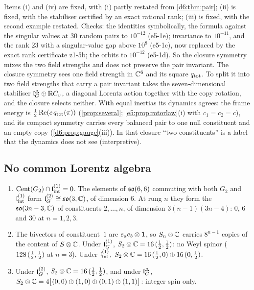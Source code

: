Items (i) and (iv) are fixed, with (i) partly restated from \cref{d6:thm:pair}; (ii) is fixed, with the stabiliser certified by an exact rational rank;
(iii) is fixed, with the second example restated. Checks: the identities symbolically, the formula against the singular values at $30$ random
pairs to $10^{-12}$ (e5-1e); invariance to $10^{-11}$, and the rank $23$ with a singular-value gap above $10^8$ (e5-1c), now replaced by the exact rank certificate z1-5b; the orbits to
$10^{-12}$ (e5-1d). So the closure symmetry mixes the two field strengths and does not preserve the pair invariant. The closure symmetry sees one field strength in $\mathbb{C}^6$ and its square $q_{\rm tot}$. To split it into two
field strengths that carry a pair invariant takes the seven-dimensional stabiliser $\mathfrak l_G^\Delta\oplus\mathbb{R} C_v$, a diagonal Lorentz action together
with the copy rotation, and the closure selects neither. With equal inertias its dynamics agrees: the frame energy is $\tfrac12\operatorname{Re}(c\,q_{\rm tot}(\pi))$
(\cref{prop:several}; \cref{e5:prop:rotorlaw}(i) with $c_1=c_2=c$), and its compact symmetry carries every balanced pair to one null constituent and an empty copy (\cref{d6:prop:gauge}(iii)). In that closure ``two constituents'' is a label that the dynamics does not see (interpretive).

\subsection{No common Lorentz algebra}
\label{e5:sec:nocommon}

\begin{proposition}
\label{e5:prop:nocommon}
\begin{enumerate}[label=(\roman*),leftmargin=2.2em]
\item $\operatorname{Cent}(G_2)\cap\mathfrak l_{\rm int}^{(1)}=0$. The elements of $\mathfrak{so}(6,6)$ commuting with both $G_2$ and $\mathfrak l_{\rm int}^{(1)}$ form $\mathfrak l_G^{(2)}\cong\mathfrak{so}(3,\mathbb{C})$, of
dimension $6$. At rung $n$ they form the $\mathfrak{so}(3n-3,\mathbb{C})$ of constituents $2,\dots,n$, of dimension $3(n-1)(3n-4)$: $0$, $6$ and $30$ at
$n=1,2,3$.
\item The bivectors of constituent~$1$ are $e_ae_b\otimes\mathbf 1$, so $S_n\otimes\mathbb{C}$ carries $8^{n-1}$ copies of the content of $S\otimes\mathbb{C}$. Under
$\mathfrak l_G^{(1)}$, $S_2\otimes\mathbb{C}=16\,(\tfrac12,\tfrac12)$: no Weyl spinor ($128\,(\tfrac12,\tfrac12)$ at $n=3$). Under $\mathfrak l_{\rm int}^{(1)}$,
$S_2\otimes\mathbb{C}=16\,(\tfrac12,0)\oplus16\,(0,\tfrac12)$.
\item Under $\mathfrak l_G^{(2)}$, $S_2\otimes\mathbb{C}=16\,(\tfrac12,\tfrac12)$, and under $\mathfrak l_G^\Delta$,
$S_2\otimes\mathbb{C}=4\bigl[(0,0)\oplus(1,0)\oplus(0,1)\oplus(1,1)\bigr]$: integer spin only.
\end{enumerate}
\end{proposition}

